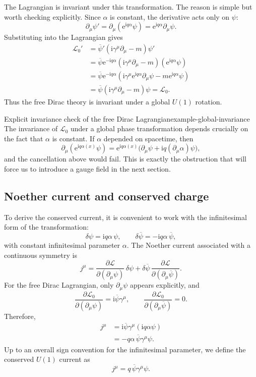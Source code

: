 \documentclass[11pt,a4paper]{article}
\newcommand{\Lag}{\mathcal{L}}
\newcommand{\ii}{\mathrm{i}}
\newcommand{\ee}{\mathrm{e}}
\newcommand{\p}{\partial}
\newcommand{\gmu}{\gamma^\mu}
\newcommand{\psibar}{\overline{\psi}}
\begin{document}
The Lagrangian is invariant under this transformation. The reason is simple but worth checking explicitly. Since \(\alpha\) is constant, the derivative acts only on \(\psi\):
\[
\p_\mu\psi' = \p_\mu(\ee^{\ii q\alpha}\psi)=\ee^{\ii q\alpha}\p_\mu\psi.
\]
Substituting into the Lagrangian gives
\begin{align}
\Lag_0'
&=
\psibar' (\ii\gmu\p_\mu-m)\psi'
\nonumber\\
&=
\psibar\ee^{-\ii q\alpha}(\ii\gmu\p_\mu-m)(\ee^{\ii q\alpha}\psi)
\nonumber\\
&=
\psibar\ee^{-\ii q\alpha}(\ii\gmu\ee^{\ii q\alpha}\p_\mu\psi-m\ee^{\ii q\alpha}\psi)
\nonumber\\
&=
\psibar(\ii\gmu\p_\mu-m)\psi
=
\Lag_0.
\end{align}
Thus the free Dirac theory is invariant under a global \(U(1)\) rotation.

\begin{examplebox}{Explicit invariance check of the free Dirac Lagrangian}{example-global-invariance}
The invariance of \(\Lag_0\) under a global phase transformation depends crucially on the fact that \(\alpha\) is constant. If \(\alpha\) depended on spacetime, then
\[
\p_\mu(\ee^{\ii q\alpha(x)}\psi)=\ee^{\ii q\alpha(x)}\bigl(\p_\mu\psi+\ii q(\p_\mu\alpha)\psi\bigr),
\]
and the cancellation above would fail. This is exactly the obstruction that will force us to introduce a gauge field in the next section.
\end{examplebox}

\subsection{Noether current and conserved charge}

To derive the conserved current, it is convenient to work with the infinitesimal form of the transformation:
\begin{equation}
\delta\psi = \ii q\alpha\,\psi,
\qquad
\delta\psibar = -\ii q\alpha\,\psibar,
\label{eq:infinitesimal-u1-expanded}
\end{equation}
with constant infinitesimal parameter \(\alpha\). The Noether current associated with a continuous symmetry is
\begin{equation}
j^\mu
=
\frac{\p\Lag}{\p(\p_\mu\psi)}\,\delta\psi
+
\delta\psibar\,\frac{\p\Lag}{\p(\p_\mu\psibar)}.
\label{eq:noether-current-general-expanded}
\end{equation}
For the free Dirac Lagrangian, only \(\p_\mu\psi\) appears explicitly, and
\[
\frac{\p\Lag_0}{\p(\p_\mu\psi)} = \ii\psibar\gamma^\mu,
\qquad
\frac{\p\Lag_0}{\p(\p_\mu\psibar)} = 0.
\]
Therefore,
\begin{align}
j^\mu
&=
\ii\psibar\gamma^\mu(\ii q\alpha\psi)
\nonumber\\
&=
- q\alpha\,\psibar\gamma^\mu\psi.
\end{align}
Up to an overall sign convention for the infinitesimal parameter, we define the conserved \(U(1)\) current as
\begin{equation}
j^\mu = q\,\psibar\gamma^\mu\psi.
\label{eq:noether-current-expanded}
\end{equation}
\end{document}
